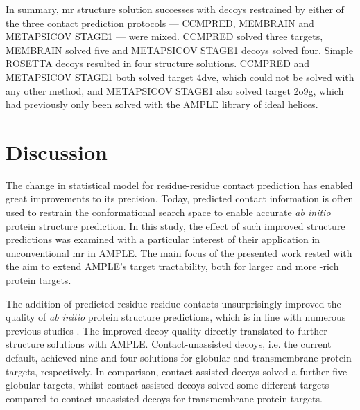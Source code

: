 In summary, \gls{mr} structure solution successes with decoys restrained by either of the three contact prediction protocols --- CCMPRED, MEMBRAIN and METAPSICOV STAGE1 --- were mixed. CCMPRED solved three targets, MEMBRAIN solved
five and METAPSICOV STAGE1 decoys solved four. Simple ROSETTA decoys resulted in four structure solutions. CCMPRED and METAPSICOV STAGE1 both solved target 4dve, which could not be solved with any other method, and METAPSICOV STAGE1 also solved target 2o9g, which had previously only been solved with the AMPLE library of ideal helices.

\section{Discussion}
The change in statistical model for residue-residue contact prediction has enabled great improvements to its precision. Today, predicted contact information is often used to restrain the conformational search space to enable accurate \textit{ab initio} protein structure prediction. In this study, the effect of such improved structure predictions was examined with a particular interest of their application in unconventional \gls{mr} in AMPLE. The main focus of the presented work rested with the aim to extend AMPLE's target tractability, both for larger and more \textbeta-rich protein targets.

The addition of predicted residue-residue contacts unsurprisingly improved the quality of \textit{ab initio} protein structure predictions, which is in line with numerous previous studies \cite[e.g.,][]{Marks2011-os,Michel2014-eg,Kosciolek2014-bt,Ovchinnikov2015-tn,Ovchinnikov2016-jj,Michel2017-xh,De_Oliveira2017-sg,Ovchinnikov2017-nd,Wang2017-rx}. The improved decoy quality directly translated to further structure solutions with AMPLE. Contact-unassisted decoys, i.e. the current default, achieved nine and four solutions for globular and transmembrane protein targets, respectively. In comparison, contact-assisted decoys solved a further five globular targets, whilst contact-assisted decoys solved some different targets compared to contact-unassisted decoys for transmembrane protein targets.

